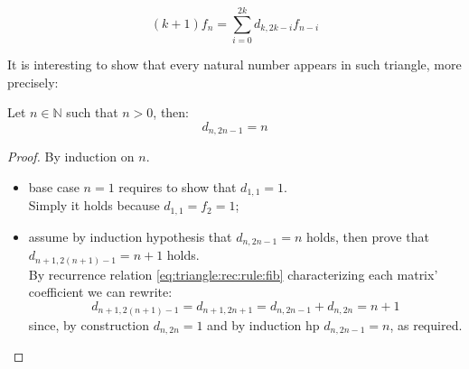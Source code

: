 \begin{thm}
    \begin{displaymath}
        \left(k + 1\right) f_{n} = \sum_{i=0}^{2 k}  d_{k,2 k - i} f_{n - i}
    \end{displaymath}
\end{thm}

It is interesting to show that every natural number appears in such triangle,
more precisely:
\begin{thm}
    Let $n\in\mathbb{N}$ such that $n > 0$, then:
    \begin{displaymath}
        d_{n,2n-1} = n
    \end{displaymath}
\end{thm}
\begin{proof}
    By induction on $n$.\\
    \begin{itemize}
        \item base case $n=1$ requires to show that $d_{1,1}=1$. \\
            Simply it holds because $d_{1,1} = f_{2} = 1$;
        \item assume by induction hypothesis that $d_{n,2n-1} = n$ holds,
            then prove that $d_{n+1,2(n+1)-1} = n+1$ holds.\\
            By recurrence relation \autoref{eq:triangle:rec:rule:fib} characterizing
            each matrix' coefficient we can rewrite: 
            \begin{displaymath}
                d_{n+1,2(n+1)-1} =d_{n+1,2n+1} = d_{n,2n-1}+d_{n,2n}=n+1
            \end{displaymath}
            since, by construction $d_{n,2n}=1$ and by induction hp $d_{n,2n-1}=n$, as required.
    \end{itemize}
\end{proof}


